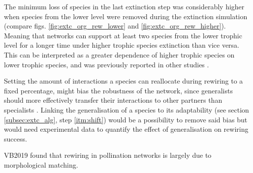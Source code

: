 \documentclass[12pt,a4paper]{article}
\begin{document}

The minimum loss of species in the last extinction step was considerably higher when species from the lower level were removed during the extinction simulation (compare figs. \ref{fig:extc_org_rew_lower} and \ref{fig:extc_org_rew_higher}). 
Meaning that networks can support at least two species from the lower trophic level for a longer time under higher trophic species extinction than vice versa. This can be interpreted as a greater dependence of higher trophic species on lower trophic species, and was previously reported in other studies \parencite{Bascompte2006, Schleuning2016}.


Setting the amount of interactions a species can reallocate during rewiring to a fixed percentage, might bias the robustness of the network, since generalists should more effectively transfer their interactions to other partners than specialists \parencite{Ramos-Jiliberto2012}. Linking the generalisation of a species to its adaptability (see section \ref{subsec:extc_alg}, step \ref{itm:shift}) would be a possibility to remove said bias but would need experimental data to quantify the effect of generalisation on rewiring success.

VB2019 found that rewiring in pollination networks is largely due to morphological matching. 


\end{document}

